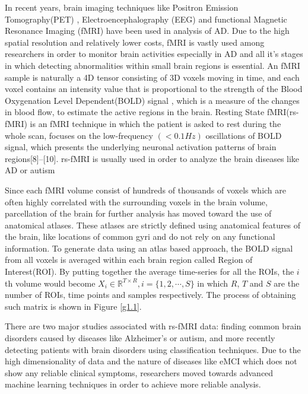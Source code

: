 \documentclass[journal]{IEEEtran}
\begin{document}
	
	In recent years, brain imaging techniques like Positron Emission Tomography(PET) \cite{r21}, Electroencephalography (EEG)\cite{r22} and functional Magnetic Resonance Imaging (fMRI)\cite{r23} have been used in analysis of AD. Due to the high spatial resolution and relatively lower costs, fMRI is vastly used among researchers in order to monitor brain activities especially in AD and all it's stages in which detecting abnormalities within small brain regions is essential. 
	An fMRI sample is naturally a 4D tensor consisting of 3D voxels moving in time, and each voxel contains an intensity value that is proportional to the strength of the Blood Oxygenation Level Dependent(BOLD) signal , which is a measure of the changes in blood flow, to estimate the active regions in the brain\cite{r07}.
	Resting State fMRI(rs-fMRI) is an fMRI technique in which the patient is asked to rest during the whole scan, focuses on the low-frequency $\left( < 0.1 Hz \right)$  oscillations of BOLD signal, which presents the underlying neuronal activation patterns of brain regions[8]–[10]. rs-fMRI is usually used in order to analyze the brain diseases like AD or autism\cite{r33,r34}
	
	Since each fMRI volume consist of hundreds of thousands of voxels which are often highly correlated with the surrounding voxels in the brain volume, parcellation of the brain for further analysis has moved toward the use
	of anatomical atlases. These atlases are strictly defined using
	anatomical features of the brain, like locations of common gyri
	and do not rely on any functional information.
	To generate data
	using an atlas based approach, the BOLD signal from all voxels is averaged within each brain region called Region of Interest(ROI)\cite{r09}.
	By putting together the average time-series for all the ROIs, the $i$th volume would become $X_i \in \mathbb{R}^{T \times R} , i = \{1,2,\cdots, S\}$ in which $R$, $T$ and $S$ are the number of ROIs, time points and samples respectively. The process of obtaining such matrix is shown in Figure \eqref{g1.1}. 
	
	There are two major studies associated with rs-fMRI data: finding common brain disorders caused by diseases like Alzheimer's or autism, and more recently detecting patients with brain disorders using classification techniques. Due to the high dimensionality of data and the nature of diseases like eMCI which does not show any reliable clinical symptoms,
	researchers moved towards advanced machine learning techniques in order to achieve more reliable analysis.
	
\end{document}
